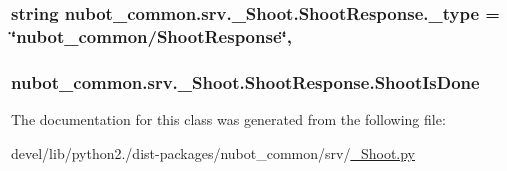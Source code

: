 \hypertarget{classnubot__common_1_1srv_1_1__Shoot_1_1ShootResponse_aa92cdf8de4ccfb83cebd0b0ccda0f344}{
\subsubsection[{\-\_\-type}]{\setlength{\rightskip}{0pt plus 5cm}string nubot\-\_\-common.\-srv.\-\_\-\-Shoot.\-Shoot\-Response.\-\_\-type = \char`\"{}nubot\-\_\-common/{\bf Shoot\-Response}\char`\"{}\hspace{0.3cm}{\ttfamily [static]}, {\ttfamily [private]}}}\label{classnubot__common_1_1srv_1_1__Shoot_1_1ShootResponse_aa92cdf8de4ccfb83cebd0b0ccda0f344}
\hypertarget{classnubot__common_1_1srv_1_1__Shoot_1_1ShootResponse_ae79abbfb6fdf49f5de0576d84a1125b4}{
\subsubsection[{Shoot\-Is\-Done}]{\setlength{\rightskip}{0pt plus 5cm}nubot\-\_\-common.\-srv.\-\_\-\-Shoot.\-Shoot\-Response.\-Shoot\-Is\-Done}}\label{classnubot__common_1_1srv_1_1__Shoot_1_1ShootResponse_ae79abbfb6fdf49f5de0576d84a1125b4}


The documentation for this class was generated from the following file\-:\begin{DoxyCompactItemize}
\item 
devel/lib/python2./dist-\/packages/nubot\-\_\-common/srv/\hyperlink{__Shoot_8py}{\-\_\-\-Shoot.\-py}\end{DoxyCompactItemize}
